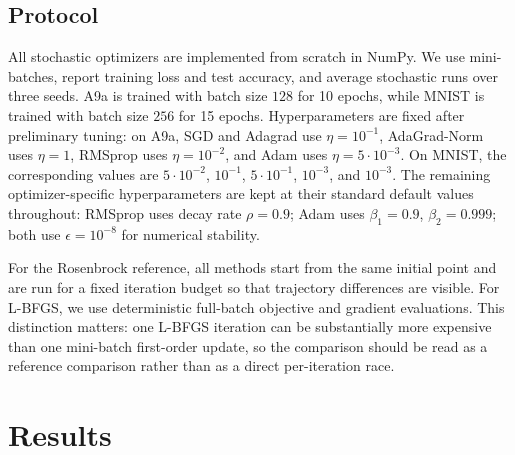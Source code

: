\documentclass{article}
\begin{document}
\subsection{Protocol}
All stochastic optimizers are implemented from scratch in NumPy. We use mini-batches, report training loss and test accuracy, and average stochastic runs over three seeds. A9a is trained with batch size $128$ for 10 epochs, while MNIST is trained with batch size $256$ for 15 epochs. Hyperparameters are fixed after preliminary tuning: on A9a, SGD and Adagrad use $\eta=10^{-1}$, AdaGrad-Norm uses $\eta=1$, RMSprop uses $\eta=10^{-2}$, and Adam uses $\eta=5\cdot 10^{-3}$. On MNIST, the corresponding values are $5\cdot10^{-2}$, $10^{-1}$, $5\cdot10^{-1}$, $10^{-3}$, and $10^{-3}$. The remaining optimizer-specific hyperparameters are kept at their standard default values throughout: RMSprop uses decay rate $\rho=0.9$; Adam uses $\beta_1=0.9$, $\beta_2=0.999$; both use $\epsilon=10^{-8}$ for numerical stability.

For the Rosenbrock reference, all methods start from the same initial point and are run for a fixed iteration budget so that trajectory differences are visible. For L-BFGS, we use deterministic full-batch objective and gradient evaluations. This distinction matters: one L-BFGS iteration can be substantially more expensive than one mini-batch first-order update, so the comparison should be read as a reference comparison rather than as a direct per-iteration race.

\section{Results}
\end{document}

